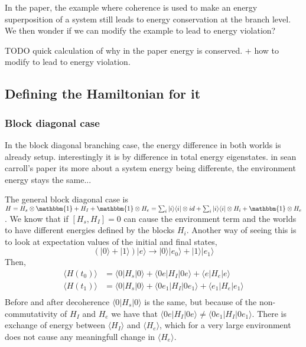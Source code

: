 \documentclass{article}
\begin{document}
In the paper, the example where coherence is used to make an energy superposition of a system still leads to energy conservation at the branch level. We then wonder if we can modify the example to lead to energy violation?

TODO quick calculation of why in the paper energy is conserved.
+ how to modify to lead to energy violation.


\subsection{Defining the Hamiltonian for it}

\subsubsection{Block diagonal case}

In the block diagonal branching case, the energy difference in both worlds is already setup. interestingly it is by difference in total energy eigenstates. in sean carroll's paper its more about a system energy being differente, the environment energy stays the same...  

The general block diagonal case is $H=H_s\otimes \mathbbm{1}+H_I+\mathbbm{1}\otimes H_e = \sum_i|i\rangle\langle i|\otimes id+\sum_i|i\rangle\langle i|\otimes H_i+\mathbbm{1}\otimes H_e$. We know that if $[H_s,H_I]=0$ can cause the environment term and the worlds to have different energies defined by the blocks $H_i$. Another way of seeing this is to look at expectation values of the initial and final states,
\begin{equation}
    (|0\rangle+|1\rangle)|e\rangle\rightarrow|0\rangle|e_0\rangle+|1\rangle|e_1\rangle
\end{equation}
Then, 
\begin{align}
    \langle H(t_0)\rangle&=\langle 0|H_s|0\rangle+\langle 0e| H_I|0e\rangle+\langle e|H_e|e\rangle\\
    \langle H(t_1)\rangle&=\langle 0|H_s|0\rangle+\langle 0e_1| H_I|0e_1\rangle+\langle e_1|H_e|e_1\rangle\\
\end{align}
Before and after decoherence $\langle 0|H_s|0\rangle$ is the same, but because of the non-commutativity of $H_I$ and $H_e$ we have that $\langle 0e| H_I|0e\rangle\neq\langle 0e_1| H_I|0e_1\rangle$. There is exchange of energy between $\langle H_I\rangle$ and $\langle H_e\rangle$, which for a very large environment does not cause any meaningfull change in $\langle H_e\rangle$. 
\end{document}
